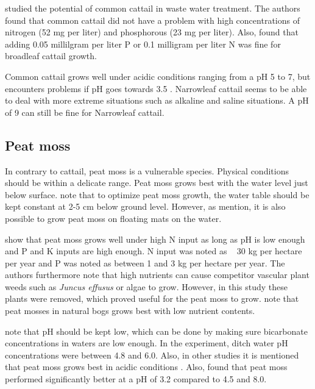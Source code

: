 \documentclass[a4paper,12pt]{scrbook}
\begin{document}
\citet{ciria2005Typha} studied the potential of common cattail in waste water treatment. The authors found that common cattail did not have a problem with high concentrations of nitrogen (52 mg per liter) and phosphorous (23 mg per liter). Also, \citet{newman1996effects} found that adding 0.05 millilgram per liter P or 0.1 milligram per liter N was fine for broadleaf cattail growth.

Common cattail grows well under acidic conditions ranging from a pH 5 to 7, but encounters problems if pH goes towards 3.5 \citep{brix2002typha}. Narrowleaf cattail seems to be able to deal with more extreme situations such as alkaline and saline situations. A pH of 9 can still be fine for Narrowleaf cattail.



\subsection{Peat moss}

In contrary to cattail, peat moss is a vulnerable species. Physical conditions should be within a delicate range. Peat moss grows best with the water level just below surface.  \citet{fritz2014paludicultuur} note that to optimize peat moss growth, the water table should be kept constant at 2-5 cm below ground level. However, as \citet{gaudig2014sphagnum} mention, it is also possible to grow peat moss on floating mats on the water.

\citet{Temmink2017196} show that peat moss grows well under high N input as long as pH is low enough and P and K inputs are high enough. 
N input was noted as ~ 30 kg per hectare per year and P was noted as between 1 and 3 kg per hectare per year.  The authors furthermore note that high nutrients can cause competitor vascular plant weeds such as \textit{Juncus effusus} or algae to grow. However, in this study these plants were removed, which proved useful for the peat moss to grow. \citep{wichtmann2016paludiculture} note that peat mosses in natural bogs grows best with low nutrient contents.


\citet{Temmink2017196} note that pH should be kept low, which can be done by making sure bicarbonate concentrations in waters are low enough. In the experiment, ditch water pH concentrations were between 4.8 and 6.0. Also, in other studies it is mentioned that peat moss grows best in acidic conditions \citep{wichtmann2016paludiculture}. Also, \citet{gaudig2005growing} found that peat moss performed significantly better at a pH of 3.2 compared to 4.5 and 8.0. 
\end{document}
